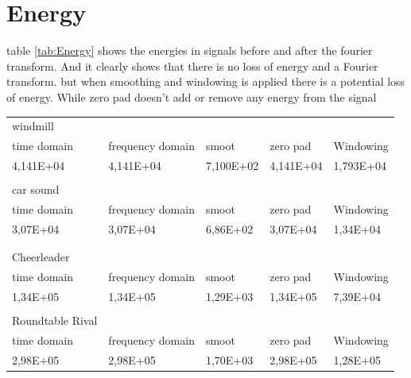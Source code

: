 \section{Energy} 
table \ref{tab:Energy} shows the energies in signals before and after the fourier transform. And it clearly shows that there is no loss of energy and a Fourier transform.
but when smoothing and windowing is applied there is a potential loss of energy. While zero pad doesn't add or remove any energy from the signal
\begin{table}[]
\centering
\begin{tabular}{lllll}
windmill                      &                  &           &           &           \\
time domain                   & frequency domain & smoot     & zero pad  & Windowing \\
4,141E+04                     & 4,141E+04        & 7,100E+02 & 4,141E+04 & 1,793E+04 \\
                              &                  &           &           &           \\
car sound                     &                  &           &           &           \\
time domain                   & frequency domain & smoot     & zero pad  & Windowing \\
3,07E+04                      & 3,07E+04         & 6,86E+02  & 3,07E+04  & 1,34E+04  \\
                              &                  &           &           &           \\
                              &                  &           &           &           \\
Cheerleader                   &                  &           &           &           \\
time domain                   & frequency domain & smoot     & zero pad  & Windowing \\
1,34E+05                      & 1,34E+05         & 1,29E+03  & 1,34E+05  & 7,39E+04  \\
                              &                  &           &           &           \\
Roundtable Rival              &                  &           &           &           \\
time domain                   & frequency domain & smoot     & zero pad  & Windowing \\
2,98E+05                      & 2,98E+05         & 1,70E+03  & 2,98E+05  & 1,28E+05  \\

\end{tabular}
\end{table}
